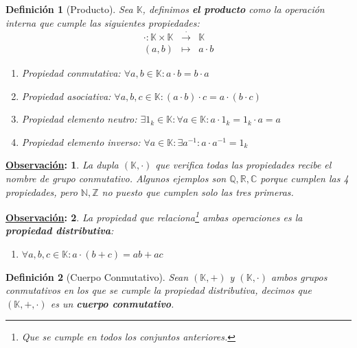 \documentclass[10pt,a4paper,openright]{book}
\theoremstyle{break}
\newtheorem*{defi}{Definición}
\newtheorem*{obs}{\underline{Observación}:}
\begin{document}
\begin{defi}[Producto]
Sea $\mathbb K$, definimos \textbf{el producto} como la operación interna que cumple las siguientes propiedades:
\begin{eqnarray*}
\cdot: \mathbb K \times\mathbb K & \stackrel{\cdot}{\rightarrow} & \mathbb K \\
(a,b) & \longmapsto  & a\cdot b
\end{eqnarray*}
\begin{enumerate}
\item Propiedad conmutativa: $\forall a, b \in \mathbb K: a\cdot b=b\cdot a$
\item Propiedad asociativa: $\forall a, b, c\in \mathbb K : (a\cdot b)\cdot c=a\cdot (b\cdot c)$
\item Propiedad elemento neutro: $\exists 1_k\in \mathbb K : \forall a \in \mathbb K : a\cdot 1_k=1_k\cdot a=a$
\item Propiedad elemento inverso: $\forall a \in \mathbb K : \exists a^{-1} : a\cdot a^{-1}=1_k$
\end{enumerate}
\end{defi}

\begin{obs}
La dupla $(\mathbb K, \cdot)$ que verifica todas las propiedades recibe el nombre de grupo conmutativo. Algunos ejemplos son $\mathbb {Q, R, C}$ porque cumplen las 4 propiedades, pero $\mathbb {N,Z}$ no puesto que cumplen solo las tres primeras.
\end{obs}

\begin{obs}
La propiedad que relaciona\footnote{Que se cumple en todos los conjuntos anteriores.} ambas operaciones es la \textbf{propiedad distributiva}:
\begin{enumerate}
\item[5.] $\forall a,b,c\in \mathbb K: a\cdot (b+c)=ab+ac$
\end{enumerate}
\end{obs}

\begin{defi}[Cuerpo Conmutativo]
Sean $(\mathbb K, +)$ y $(\mathbb K, \cdot)$ ambos grupos conmutativos en los que se cumple la propiedad distributiva, decimos que $(\mathbb K, +, \cdot)$ es un \textbf{cuerpo conmutativo}.
\end{defi}
\end{document}
